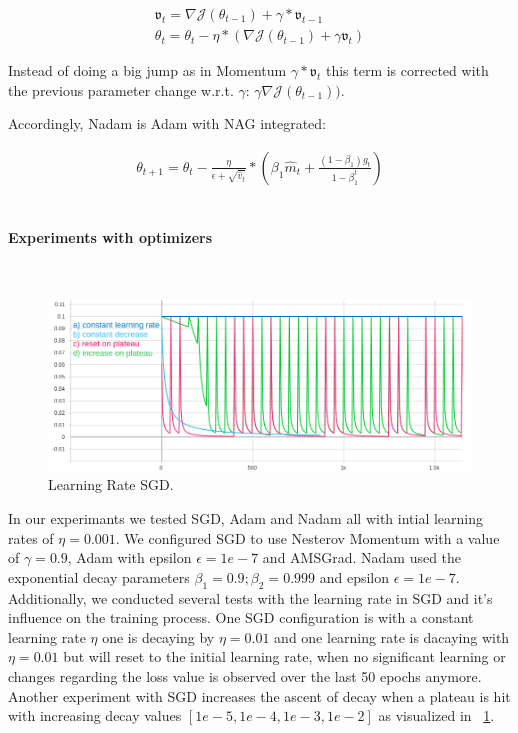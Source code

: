 \begin{align}
    \mathfrak{v}_t =\nabla\mathcal{J}(\theta_{t-1})+\gamma*\mathfrak{v}_{t-1} \label{eqn:nag:1}\\
    \theta_t = \theta_t - \eta * (\nabla\mathcal{J}(\theta_{t-1})+\gamma\mathfrak{v}_{t}) \label{eqn:nag:2}
\end{align}

Instead of doing a big jump as in Momentum $\gamma*\mathfrak{v}_{t}$ this term is corrected with the previous
parameter change w.r.t. $\gamma$:
$\gamma\nabla\mathcal{J}(\theta_{t-1}))$.

Accordingly, Nadam is Adam with NAG integrated:

\begin{align}
    \theta_{t+1} = \theta_{t} - \frac{\eta}{\epsilon+\sqrt{\hat{v}_t}} * (\beta_1\hat{m}_t+\frac{(1-\beta_1)g_t}{1-\beta_1^t}) \label{eqn:nadam:1}
\end{align}
\\ \par

\paragraph{Experiments with optimizers}\mbox{}\\
\begin{figure}[H]
    \centering
    \includegraphics[width=\textwidth,height=\textheight,keepaspectratio]{img/learning_rate2.png}
    \decoRule
    \caption[Learning Rate SGD]{Learning Rate SGD.}
    \label{fig:sgd-learning-rate}
\end{figure}
In our experimants we tested SGD, Adam and Nadam all with intial learning rates of $\eta=0.001$.
We configured SGD to use Nesterov Momentum with a value of $\gamma=0.9$, Adam with  epsilon $\epsilon=1e-7$ and AMSGrad.
Nadam used the exponential decay parameters $\beta_1=0.9; \beta_2=0.999$ and epsilon $\epsilon=1e-7$.
Additionally, we conducted several tests with the learning rate in SGD and it's influence on the training process.
One SGD configuration is with a constant learning rate $\eta$ one is decaying by $\eta=0.01$ and one learning rate
is dacaying with $\eta=0.01$ but will reset to the initial learning rate, when no significant learning or changes regarding
the loss value is observed over the last 50 epochs anymore.
Another experiment with SGD increases the ascent of decay when a plateau is hit with increasing decay values
$[1e-5, 1e-4, 1e-3, 1e-2]$ as visualized in ~\ref{fig:sgd-learning-rate}.



